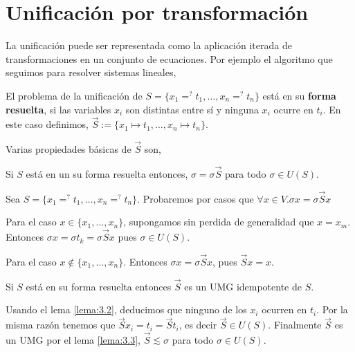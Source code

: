 \section{Unificación por transformación}

La unificación puede ser representada como la aplicación iterada de
transformaciones en un conjunto de ecuaciones. Por ejemplo el
algoritmo que seguimos para resolver sistemas lineales,


\begin{defi}
  El problema de la unificación de 
  $S = \{ x_1 =^? t_1, \dots, x_n =^? t_n \}$ 
  está en su \textbf{forma resuelta}, si las variables $x_i$ son distintas
  entre sí y ninguna $x_i$ ocurre en $t_i$. En este caso definimos, 
  $\vec{S} := \{x_1 \mapsto t_1, \dots, x_n \mapsto t_n \}$.
\end{defi}

Varias propiedades básicas de $\vec{S}$ son,

\begin{lema} \label{lema:3.3}
  Si $S$ está en un su forma resuelta entonces, 
  $\sigma = \sigma \vec{S}$ 
  para todo $\sigma \in U(S)$.
\end{lema}

\begin{demo}
  Sea $S = \{ x_1 =^? t_1, \dots, x_n =^? t_n \}$. Probaremos por
  casos que $\forall x \in V. \sigma x = \sigma \vec{S} x$

  Para el caso $x \in \{x_1, \dots, x_n \}$, supongamos sin perdida de
  generalidad que $x = x_m$. Entonces
  $\sigma x = \sigma t_k = \sigma \vec{S} x$ pues $\sigma \in U(S)$.

  Para el caso $x \not \in \{x_1, \dots, x_n \}$. Entonces
  $\sigma x = \sigma \vec{S} x$, pues $\vec{S} x = x$.
\end{demo}

\begin{lema}
  Si $S$ está en su forma resuelta entonces $\vec{S}$ es un UMG
  idempotente de $S$.
\end{lema}

\begin{demo}
  Usando el lema \ref{lema:3.2}, deducimos que ninguno de los $x_i$
  ocurren en $t_i$. Por la misma razón tenemos que
  $\vec{S} x_i = t_i = \vec{S} t_i$, es decir $\vec{S} \in U(S)$.
  Finalmente $\vec{S}$ es un UMG por el lema \ref{lema:3.3},
  $\vec{S} \lesssim \sigma$ para todo $\sigma \in U(S)$.
\end{demo}

